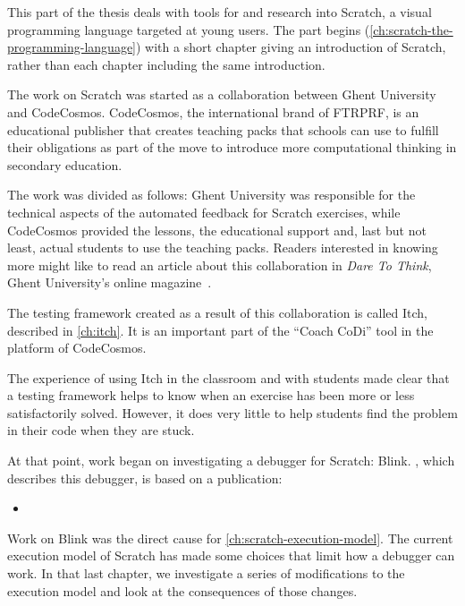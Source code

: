 \documentclass[./main]{subfiles}
\begin{document}
This part of the thesis deals with tools for and research into Scratch, a visual programming language targeted at young users.
The part begins (\vref{ch:scratch-the-programming-language}) with a short chapter giving an introduction of Scratch, rather than each chapter including the same introduction.

The work on Scratch was started as a collaboration between Ghent University and CodeCosmos.
CodeCosmos, the international brand of FTRPRF, is an educational publisher that creates teaching packs that schools can use to fulfill their obligations as part of the move to introduce more computational thinking in secondary education.

The work was divided as follows: Ghent University was responsible for the technical aspects of the automated feedback for Scratch exercises, while CodeCosmos provided the lessons, the educational support and, last but not least, actual students to use the teaching packs.
Readers interested in knowing more might like to read an article about this collaboration in \textit{Dare To Think}, Ghent University's online magazine~\autocite{redactiedurfdenkenCoachCoDiMotivationboosting2023}.

The testing framework created as a result of this collaboration is called Itch, described in \vref{ch:itch}.
It is an important part of the ``Coach CoDi'' tool in the platform of CodeCosmos.

The experience of using Itch in the classroom and with students made clear that a testing framework helps to know when an exercise has been more or less satisfactorily solved.
However, it does very little to help students find the problem in their code when they are stuck.

At that point, work began on investigating a debugger for Scratch: Blink.
, which describes this debugger, is based on a publication:

\begin{itemize}
    \item {}
\end{itemize}

Work on Blink was the direct cause for \vref{ch:scratch-execution-model}.
The current execution model of Scratch has made some choices that limit how a debugger can work.
In that last chapter, we investigate a series of modifications to the execution model and look at the consequences of those changes.
\end{document}
